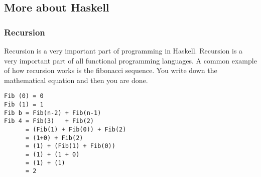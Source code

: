 \documentclass{article}
\begin{document}
\subsection{More about Haskell}
\subsubsection{Recursion}
Recursion is a very important part of programming in Haskell. Recursion is a very important part of all functional programming languages. A common example of how recursion works is the fibonacci sequence. You write down the mathematical equation and then you are done.

\begin{lstlisting}
Fib (0) = 0
Fib (1) = 1
Fib b = Fib(n-2) + Fib(n-1)
Fib 4 = Fib(3)   + Fib(2)
      = (Fib(1) + Fib(0)) + Fib(2)
      = (1+0) + Fib(2)
      = (1) + (Fib(1) + Fib(0))
      = (1) + (1 + 0)
      = (1) + (1)
      = 2
\end{lstlisting}

\end{document}
